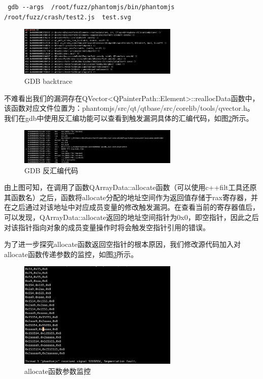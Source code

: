 \documentclass[doctor,privacy,twoside]{buaa_mac}
\begin{document}
\lstset{language=JavaScript}
\begin{lstlisting}
 gdb --args  /root/fuzz/phantomjs/bin/phantomjs /root/fuzz/crash/test2.js  test.svg 
 \end{lstlisting}
 
\centerline{}
\begin{figure}[!h]
  \centering
  \includegraphics[width=0.68\textwidth]{images/gdb_backtrace.png}
  \caption{GDB backtrace}
  \label{fig:logo}
\end{figure}
\centerline{}
 
 不难看出我们的漏洞存在QVector<QPainterPath::Element>::reallocData函数中，该函数对应文件位置为：phantomjs/src/qt/qtbase/src/corelib/tools/qvector.h。 我们在gdb中使用反汇编功能可以查看到触发漏洞具体的汇编代码，如图\ref{fig:gdb}所示。
 
 \centerline{}
\begin{figure}[!h]
  \centering
  \includegraphics[width=0.68\textwidth]{images/gdb_disassemble.png}
  \caption{GDB 反汇编代码}
  \label{fig:gdb}
\end{figure}
\centerline{}
 
 由上图可知，在调用了函数QArrayData::allocate函数（可以使用c++filt工具还原其函数名）之后，函数将allocate分配的地址空间作为返回值存储于rax寄存器，并在之后通过对该地址中对应成员变量的修改触发漏洞。在查看当前的寄存器值后，可以发现，QArrayData::allocate返回的地址空间指针为0x0，即空指针，因此之后对该指针指向对象的成员变量操作时将会触发空指针引用的错误。
 
 为了进一步探究allocate函数返回空指针的根本原因，我们修改源代码加入对allocate函数传递参数的监控，如图\ref{fig:allocate}所示。
 
  \centerline{}
\begin{figure}[!h]
  \centering
  \includegraphics[width=0.68\textwidth]{images/gdb_parameter.png}
  \caption{allocate函数参数监控}
  \label{fig:allocate}
\end{figure}
\centerline{}
\end{document}
